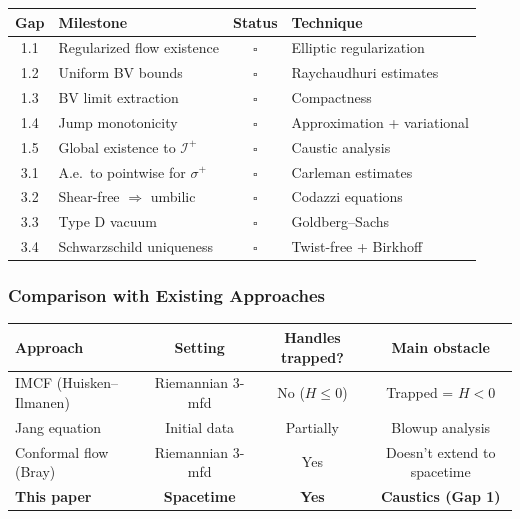 \begin{center}
\renewcommand{\arraystretch}{1.3}
\begin{tabular}{|c|l|c|l|}
\hline
\textbf{Gap} & \textbf{Milestone} & \textbf{Status} & \textbf{Technique} \\
\hline
1.1 & Regularized flow existence & $\square$ & Elliptic regularization \\
1.2 & Uniform BV bounds & $\square$ & Raychaudhuri estimates \\
1.3 & BV limit extraction & $\square$ & Compactness \\
1.4 & Jump monotonicity & $\square$ & Approximation + variational \\
1.5 & Global existence to $\mathscr{I}^+$ & $\square$ & Caustic analysis \\
\hline
3.1 & A.e.\ to pointwise for $\sigma^+$ & $\square$ & Carleman estimates \\
3.2 & Shear-free $\Rightarrow$ umbilic & $\square$ & Codazzi equations \\
3.3 & Type D vacuum & $\square$ & Goldberg--Sachs \\
3.4 & Schwarzschild uniqueness & $\square$ & Twist-free + Birkhoff \\
\hline
\end{tabular}
\end{center}

\subsubsection{Comparison with Existing Approaches}

\begin{center}
\renewcommand{\arraystretch}{1.2}
\begin{tabular}{|l|c|c|c|}
\hline
\textbf{Approach} & \textbf{Setting} & \textbf{Handles trapped?} & \textbf{Main obstacle} \\
\hline
IMCF (Huisken--Ilmanen) & Riemannian 3-mfd & No ($H \leq 0$) & Trapped = $H < 0$ \\
Jang equation & Initial data & Partially & Blowup analysis \\
Conformal flow (Bray) & Riemannian 3-mfd & Yes & Doesn't extend to spacetime \\
\textbf{This paper} & \textbf{Spacetime} & \textbf{Yes} & \textbf{Caustics (Gap 1)} \\
\hline
\end{tabular}
\end{center}

